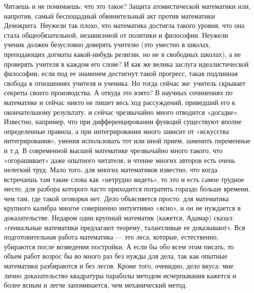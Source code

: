 Читаешь и не понимаешь: что это такое? Защита атомистической
математики или, напротив, самый беспощадный обвинительный акт против
математики Демокрита. Неужели так плохо, что математика достигла
такого уровня, что она стала общеобязательной, независимой от политики
и философии. Неужели ученик должен безусловно доверять учителю (это
уместно в школах, преподающих догматы какой-нибудь религии, но не в
свободных школах), а не проверять учителя в каждом его слове? И как же
велика заслуга идеалистической философии, если под ее знаменем
достигнут такой прогресс, такая подлинная свобода в отношениях учителя
и ученика. Но тогда сейчас же: учитель скрывает секреты своего
производства. А откуда это взято? В научных сочинениях по математике и
сейчас никто не пишет весь ход рассуждений, приведший его к
окончательному результату, и сейчас чрезвычайно много отводится
«догадке». Известно, например, что при дифференцировании функций
существуют вполне определенные правила, а при интегрировании много
зависит от «искусства интегрирования», умения использовать тот или
иной прием, заменить переменные и т.д. В современной высшей
математике чрезвычайно много такого, что «огорашивает» даже опытного
читателя, и чтение многих авторов есть очень нелегкий труд. Мало того,
для многих математиков известно, что когда встречаешь там такие слова
как «нетрудно видеть», то это и есть самое трудное место, для разбора
которого часто приходится потратить гораздо больше времени, чем там,
где такой оговорки нет. Дело объясняется просто: для математика
крупного калибра многое совершенно интуитивно «ясно», и он не
нуждается в доказательстве. Недаром один крупный математик (кажется,
Адамар) сказал: «гениальные математики предлагают теорему, талантливые
ее доказывают». Вся подготовительная работа математика --- это леса,
которые, естественно, убираются после возведения постройки. А если бы
обо всем этом писать, то объем работ возрос бы во много раз без нужды
для дела, так как опытные математики разбираются и без лесов. Кроме
того, очевидно, дело вкуса: мне лично доказательство квадратуры
параболы методом исчерпывания кажется и более ясным и легче
запоминается, чем механический метод.

